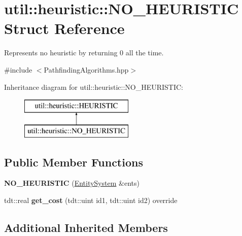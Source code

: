 \hypertarget{structutil_1_1heuristic_1_1_n_o___h_e_u_r_i_s_t_i_c}{}\section{util\+:\+:heuristic\+:\+:N\+O\+\_\+\+H\+E\+U\+R\+I\+S\+T\+IC Struct Reference}
\label{structutil_1_1heuristic_1_1_n_o___h_e_u_r_i_s_t_i_c}


Represents no heuristic by returning 0 all the time.  




{\ttfamily \#include $<$Pathfinding\+Algorithms.\+hpp$>$}

Inheritance diagram for util\+:\+:heuristic\+:\+:N\+O\+\_\+\+H\+E\+U\+R\+I\+S\+T\+IC\+:\begin{figure}[H]
\begin{center}
\leavevmode
\includegraphics[height=2.000000cm]{structutil_1_1heuristic_1_1_n_o___h_e_u_r_i_s_t_i_c}
\end{center}
\end{figure}
\subsection*{Public Member Functions}
\begin{DoxyCompactItemize}
\item 
{\bfseries N\+O\+\_\+\+H\+E\+U\+R\+I\+S\+T\+IC} (\hyperlink{class_entity_system}{Entity\+System} \&ents)\hypertarget{structutil_1_1heuristic_1_1_n_o___h_e_u_r_i_s_t_i_c_ac8bf80b8fb6e6f5ddf3d3eb605bcf47d}{}\label{structutil_1_1heuristic_1_1_n_o___h_e_u_r_i_s_t_i_c_ac8bf80b8fb6e6f5ddf3d3eb605bcf47d}

\item 
tdt\+::real {\bfseries get\+\_\+cost} (tdt\+::uint id1, tdt\+::uint id2) override\hypertarget{structutil_1_1heuristic_1_1_n_o___h_e_u_r_i_s_t_i_c_a39e1b483a61ee4288a8f5bf18633f6c9}{}\label{structutil_1_1heuristic_1_1_n_o___h_e_u_r_i_s_t_i_c_a39e1b483a61ee4288a8f5bf18633f6c9}

\end{DoxyCompactItemize}
\subsection*{Additional Inherited Members}



